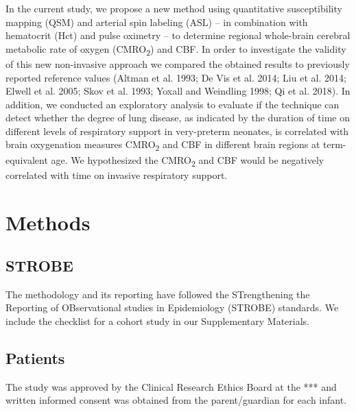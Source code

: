 \documentclass[
  letterpaper,
  DIV=11,
  numbers=noendperiod]{scrartcl}
\begin{document}
In the current study, we propose a new method using quantitative
susceptibility mapping (QSM) and arterial spin labeling (ASL) -- in
combination with hematocrit (Hct) and pulse oximetry -- to determine
regional whole-brain cerebral metabolic rate of oxygen
(CMRO\textsubscript{2}) and CBF. In order to investigate the validity of
this new non-invasive approach we compared the obtained results to
previously reported reference values (Altman et al. 1993; De Vis et al.
2014; Liu et al. 2014; Elwell et al. 2005; Skov et al. 1993; Yoxall and
Weindling 1998; Qi et al. 2018). In addition, we conducted an
exploratory analysis to evaluate if the technique can detect whether the
degree of lung disease, as indicated by the duration of time on
different levels of respiratory support in very-preterm neonates, is
correlated with brain oxygenation measures CMRO\textsubscript{2} and CBF
in different brain regions at term-equivalent age. We hypothesized the
CMRO\textsubscript{2} and CBF would be negatively correlated with time
on invasive respiratory support.

\section{Methods}\label{methods}

\subsection{STROBE}\label{strobe}

The methodology and its reporting have followed the STrengthening the
Reporting of OBservational studies in Epidemiology (STROBE) standards.
We include the checklist for a cohort study in our Supplementary
Materials.

\subsection{Patients}\label{patients}

The study was approved by the Clinical Research Ethics Board at the ***
and written informed consent was obtained from the parent/guardian for
each infant.
\end{document}
